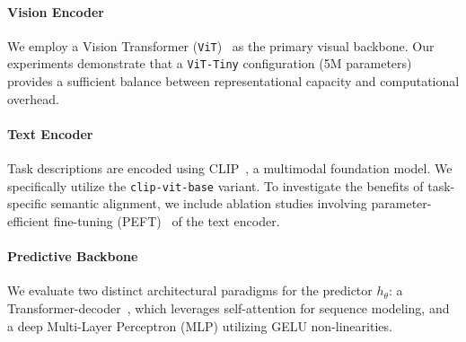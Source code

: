 \paragraph{Vision Encoder} We employ a Vision Transformer (\texttt{ViT})~\cite{vit} as the primary visual backbone. Our experiments demonstrate that a \texttt{ViT-Tiny} configuration (5M parameters) provides a sufficient balance between representational capacity and computational overhead.

\paragraph{Text Encoder} Task descriptions are encoded using CLIP~\cite{clip}, a multimodal foundation model. We specifically utilize the \texttt{clip-vit-base} variant. To investigate the benefits of task-specific semantic alignment, we include ablation studies involving parameter-efficient fine-tuning (PEFT)~\cite{hu2022lora} of the text encoder.

\paragraph{Predictive Backbone} We evaluate two distinct architectural paradigms for the predictor $h_\theta$: a Transformer-decoder~\cite{vaswani2017attention}, which leverages self-attention for sequence modeling, and a deep Multi-Layer Perceptron (MLP) utilizing GELU non-linearities.
